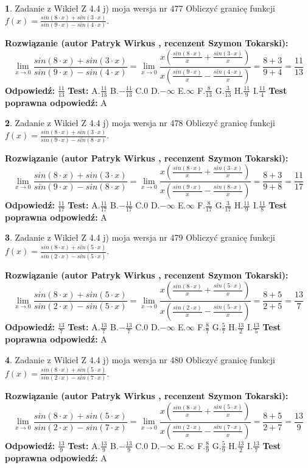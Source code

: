 \documentclass[12pt, a4paper]{article}
\theoremstyle{definition} %
\newtheorem{zad}{}
\newcommand{\zadStart}[1]{\begin{zad}#1\newline}
\newcommand{\zadStop}{\end{zad}}
\newcommand{\rozwStart}[2]{\noindent \textbf{Rozwiązanie (autor #1 , recenzent #2): }\newline}
\newcommand{\rozwStop}{\newline}
\newcommand{\odpStart}{\noindent \textbf{Odpowiedź:}\newline}
\newcommand{\odpStop}{\newline}
\newcommand{\testStart}{\noindent \textbf{Test:}\newline}
\newcommand{\testStop}{\newline}
\newcommand{\kluczStart}{\noindent \textbf{Test poprawna odpowiedź:}\newline}
\newcommand{\kluczStop}{\newline}
\begin{document}
\zadStart{Zadanie z Wikieł Z 4.4 j) moja wersja nr 477}
Obliczyć granicę funkcji $f(x)=\frac{sin(8\cdot x) +sin(3\cdot x)}{sin(9\cdot x) -sin(4\cdot x)}$.
\zadStop
\rozwStart{Patryk Wirkus}{Szymon Tokarski}
$$\lim\limits_{x\to 0}\frac{sin(8\cdot x) +sin(3\cdot x)}{sin(9\cdot x) -sin(4\cdot x)}=\lim\limits_{x\to 0}\frac{x(\frac{sin(8\cdot x)}{x}+\frac{sin(3\cdot x)}{x})}{x(\frac{sin(9\cdot x)}{x}-\frac{sin(4\cdot x)}{x})}=\frac{8+3}{9+4} = \frac{11}{13}$$
\rozwStop
\odpStart
$\frac{11}{13}$
\odpStop
\testStart
A.$\frac{11}{13}$
B.$-\frac{11}{13}$
C.$0$
D.$-\infty$
E.$\infty$
F.$\frac{8}{13}$
G.$\frac{3}{13}$
H.$\frac{11}{9}$
I.$\frac{11}{4}$
\testStop
\kluczStart
A
\kluczStop



\zadStart{Zadanie z Wikieł Z 4.4 j) moja wersja nr 478}
Obliczyć granicę funkcji $f(x)=\frac{sin(8\cdot x) +sin(3\cdot x)}{sin(9\cdot x) -sin(8\cdot x)}$.
\zadStop
\rozwStart{Patryk Wirkus}{Szymon Tokarski}
$$\lim\limits_{x\to 0}\frac{sin(8\cdot x) +sin(3\cdot x)}{sin(9\cdot x) -sin(8\cdot x)}=\lim\limits_{x\to 0}\frac{x(\frac{sin(8\cdot x)}{x}+\frac{sin(3\cdot x)}{x})}{x(\frac{sin(9\cdot x)}{x}-\frac{sin(8\cdot x)}{x})}=\frac{8+3}{9+8} = \frac{11}{17}$$
\rozwStop
\odpStart
$\frac{11}{17}$
\odpStop
\testStart
A.$\frac{11}{17}$
B.$-\frac{11}{17}$
C.$0$
D.$-\infty$
E.$\infty$
F.$\frac{8}{17}$
G.$\frac{3}{17}$
H.$\frac{11}{9}$
I.$\frac{11}{8}$
\testStop
\kluczStart
A
\kluczStop



\zadStart{Zadanie z Wikieł Z 4.4 j) moja wersja nr 479}
Obliczyć granicę funkcji $f(x)=\frac{sin(8\cdot x) +sin(5\cdot x)}{sin(2\cdot x) -sin(5\cdot x)}$.
\zadStop
\rozwStart{Patryk Wirkus}{Szymon Tokarski}
$$\lim\limits_{x\to 0}\frac{sin(8\cdot x) +sin(5\cdot x)}{sin(2\cdot x) -sin(5\cdot x)}=\lim\limits_{x\to 0}\frac{x(\frac{sin(8\cdot x)}{x}+\frac{sin(5\cdot x)}{x})}{x(\frac{sin(2\cdot x)}{x}-\frac{sin(5\cdot x)}{x})}=\frac{8+5}{2+5} = \frac{13}{7}$$
\rozwStop
\odpStart
$\frac{13}{7}$
\odpStop
\testStart
A.$\frac{13}{7}$
B.$-\frac{13}{7}$
C.$0$
D.$-\infty$
E.$\infty$
F.$\frac{8}{7}$
G.$\frac{5}{7}$
H.$\frac{13}{2}$
I.$\frac{13}{5}$
\testStop
\kluczStart
A
\kluczStop



\zadStart{Zadanie z Wikieł Z 4.4 j) moja wersja nr 480}
Obliczyć granicę funkcji $f(x)=\frac{sin(8\cdot x) +sin(5\cdot x)}{sin(2\cdot x) -sin(7\cdot x)}$.
\zadStop
\rozwStart{Patryk Wirkus}{Szymon Tokarski}
$$\lim\limits_{x\to 0}\frac{sin(8\cdot x) +sin(5\cdot x)}{sin(2\cdot x) -sin(7\cdot x)}=\lim\limits_{x\to 0}\frac{x(\frac{sin(8\cdot x)}{x}+\frac{sin(5\cdot x)}{x})}{x(\frac{sin(2\cdot x)}{x}-\frac{sin(7\cdot x)}{x})}=\frac{8+5}{2+7} = \frac{13}{9}$$
\rozwStop
\odpStart
$\frac{13}{9}$
\odpStop
\testStart
A.$\frac{13}{9}$
B.$-\frac{13}{9}$
C.$0$
D.$-\infty$
E.$\infty$
F.$\frac{8}{9}$
G.$\frac{5}{9}$
H.$\frac{13}{2}$
I.$\frac{13}{7}$
\testStop
\kluczStart
A
\kluczStop
\end{document}
